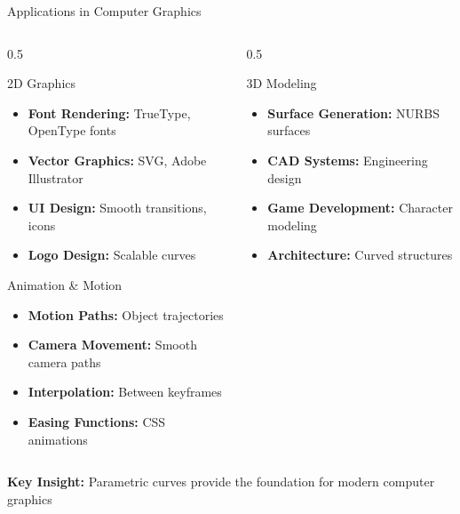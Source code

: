 \begin{frame}{Applications in Computer Graphics}
  \small
  \begin{columns}
    \begin{column}{0.5\textwidth}
      \begin{conceptbox}{2D Graphics}
        \scriptsize
        \begin{itemize}
          \item \textbf{Font Rendering:} TrueType, OpenType fonts
          \item \textbf{Vector Graphics:} SVG, Adobe Illustrator
          \item \textbf{UI Design:} Smooth transitions, icons
          \item \textbf{Logo Design:} Scalable curves
        \end{itemize}
      \end{conceptbox}

      \begin{conceptbox}{Animation \& Motion}
        \scriptsize
        \begin{itemize}
          \item \textbf{Motion Paths:} Object trajectories
          \item \textbf{Camera Movement:} Smooth camera paths
          \item \textbf{Interpolation:} Between keyframes
          \item \textbf{Easing Functions:} CSS animations
        \end{itemize}
      \end{conceptbox}
    \end{column}
    \begin{column}{0.5\textwidth}
      \begin{conceptbox}{3D Modeling}
        \scriptsize
        \begin{itemize}
          \item \textbf{Surface Generation:} NURBS surfaces
          \item \textbf{CAD Systems:} Engineering design
          \item \textbf{Game Development:} Character modeling
          \item \textbf{Architecture:} Curved structures
        \end{itemize}
      \end{conceptbox}

      \vspace{0.3cm}
    \end{column}
  \end{columns}

  \begin{center}
    \footnotesize
    \textbf{Key Insight:} Parametric curves provide the foundation for modern computer graphics
  \end{center}
\end{frame}
